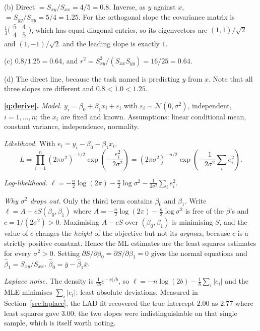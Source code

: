 \documentclass[11pt]{article}
\begin{document}
(b) Direct $= S_{xy}/S_{xx} = 4/5 = 0.8$. Inverse, as $y$ against $x$,
$= S_{yy}/S_{xy} = 5/4 = 1.25$. For the orthogonal slope the covariance matrix
is $\tfrac{1}{3}\bigl(\begin{smallmatrix}5&4\\4&5\end{smallmatrix}\bigr)$,
which has equal diagonal entries, so its eigenvectors are
$(1,1)/\sqrt2$ and $(1,-1)/\sqrt2$ and the leading slope is exactly $1$.

(c) $0.8/1.25 = 0.64$, and
$r^2 = S_{xy}^2/(S_{xx}S_{yy}) = 16/25 = 0.64$. \checkmark

(d) The direct line, because the task named is predicting $y$ from $x$. Note
that all three slopes are different and $0.8 < 1.0 < 1.25$.

\medskip
\textbf{\ref{q:derive}.} \emph{Model.}
$y_i = \beta_0 + \beta_1 x_i + \varepsilon_i$ with
$\varepsilon_i \sim \mathcal{N}(0,\sigma^2)$, independent, $i = 1,\dots,n$;
the $x_i$ are fixed and known. Assumptions: linear conditional mean, constant
variance, independence, normality.

\emph{Likelihood.} With $e_i = y_i - \beta_0 - \beta_1x_i$,
\[
  L = \prod_{i=1}^n (2\pi\sigma^2)^{-1/2}
      \exp\!\left(-\frac{e_i^2}{2\sigma^2}\right)
    = (2\pi\sigma^2)^{-n/2}\exp\!\left(-\frac{1}{2\sigma^2}\sum_i e_i^2\right).
\]

\emph{Log-likelihood.}
$\ell = -\tfrac{n}{2}\log(2\pi) - \tfrac{n}{2}\log\sigma^2
        - \tfrac{1}{2\sigma^2}\sum_i e_i^2$.

\emph{Why $\sigma^2$ drops out.} Only the third term contains $\beta_0$ and
$\beta_1$. Write $\ell = A - cS(\beta_0,\beta_1)$ where
$A = -\tfrac n2\log(2\pi) - \tfrac n2\log\sigma^2$ is free of the
$\beta$'s and $c = 1/(2\sigma^2) > 0$. Maximising $A - cS$ over
$(\beta_0,\beta_1)$ is minimising $S$, and the value of $c$ changes the
\emph{height} of the objective but not its \emph{argmax}, because $c$ is a
strictly positive constant. Hence the ML estimates are the least squares
estimates for every $\sigma^2 > 0$. Setting $\partial S/\partial\beta_0 =
\partial S/\partial\beta_1 = 0$ gives the normal equations and
$\hat\beta_1 = S_{xy}/S_{xx}$, $\hat\beta_0 = \bar y - \hat\beta_1\bar x$.

\emph{Laplace noise.} The density is $\tfrac{1}{2b}e^{-|e|/b}$, so
$\ell = -n\log(2b) - \tfrac1b\sum_i|e_i|$ and the MLE minimises
$\sum_i|e_i|$: least absolute deviations. Measured in
Section~\ref{sec:laplace}, the LAD fit recovered the true intercept $2.00$ as
$2.77$ where least squares gave $3.00$; the two slopes were indistinguishable
on that single sample, which is itself worth noting.
\end{document}
